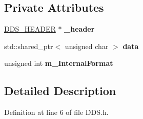 \subsection*{Private Attributes}
\begin{DoxyCompactItemize}
\item 
\hyperlink{struct_d_d_s___h_e_a_d_e_r}{D\+D\+S\+\_\+\+H\+E\+A\+D\+ER} $\ast$ {\bfseries \+\_\+header}\hypertarget{class_i_o_1_1_image_1_1_d_d_s_a86d53fba767a3a2b7e6e8323ca642d6d}{}\label{class_i_o_1_1_image_1_1_d_d_s_a86d53fba767a3a2b7e6e8323ca642d6d}

\item 
std\+::shared\+\_\+ptr$<$ unsigned char $>$ {\bfseries data}\hypertarget{class_i_o_1_1_image_1_1_d_d_s_ad819b96494a8b89ae713a4b7434146ae}{}\label{class_i_o_1_1_image_1_1_d_d_s_ad819b96494a8b89ae713a4b7434146ae}

\item 
unsigned int {\bfseries m\+\_\+\+Internal\+Format}\hypertarget{class_i_o_1_1_image_1_1_d_d_s_abd54a124f39474a3ade09c62c66e338d}{}\label{class_i_o_1_1_image_1_1_d_d_s_abd54a124f39474a3ade09c62c66e338d}

\end{DoxyCompactItemize}


\subsection{Detailed Description}


Definition at line 6 of file D\+D\+S.\+h.

